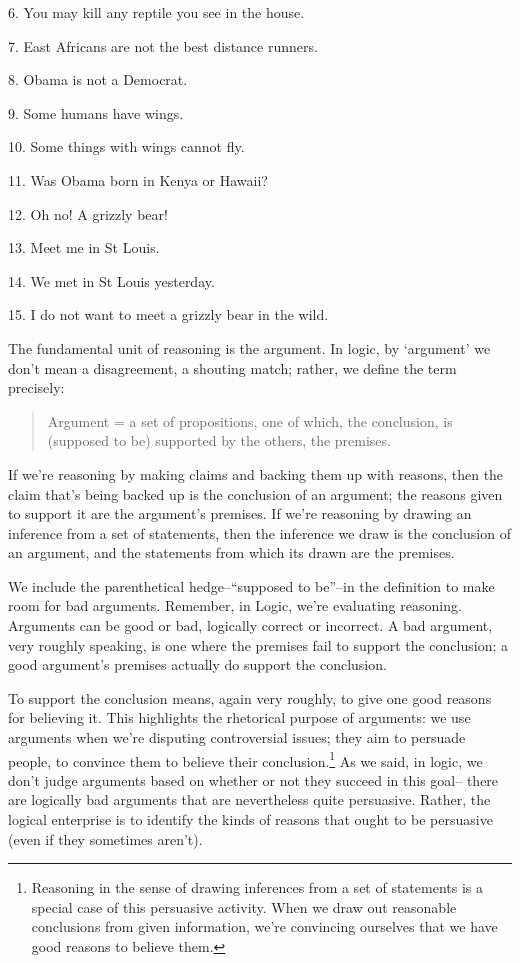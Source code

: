 6.  You may kill any reptile you see in the house.

7.  East Africans are not the best distance runners.

8.  Obama is not a Democrat.

9.  Some humans have wings.

10. Some things with wings cannot fly.

11. Was Obama born in Kenya or Hawaii?

12. Oh no! A grizzly bear!

13. Meet me in St Louis.

14. We met in St Louis yesterday.

15. I do not want to meet a grizzly bear in the wild.


The fundamental unit of reasoning is the argument. In logic, by `argument' we don't mean a
disagreement, a shouting match; rather, we define the term precisely:

\begin{quote}%
\noindent
Argument = a set of propositions, one of which, the conclusion, is (supposed to be)
supported by the others, the premises.
\end{quote}

If we're reasoning by making claims and backing them up with reasons, then the claim that's being
backed up is the conclusion of an argument; the reasons given to support it are the argument's
premises. If we're reasoning by drawing an inference from a set of statements, then the inference
we draw is the conclusion of an argument, and the statements from which its drawn are the
premises.

We include the parenthetical hedge--``supposed to be''--in the definition to make room for bad
arguments. Remember, in Logic, we're evaluating reasoning. Arguments can be good or bad,
logically correct or incorrect. A bad argument, very roughly speaking, is one where the premises
fail to support the conclusion; a good argument's premises actually do support the conclusion.

To support the conclusion means, again very roughly, to give one good reasons for believing it.
This highlights the rhetorical purpose of arguments: we use arguments when we're disputing
controversial issues; they aim to persuade people, to convince them to believe their 
conclusion.\footnote{Reasoning in the sense of drawing inferences from a set of statements is a special case of this persuasive activity.
When we draw out reasonable conclusions from given information, we're convincing ourselves that we have good
reasons to believe them.}
As we said, in logic, we don't judge arguments based on whether or not they succeed in this goal--
there are logically bad arguments that are nevertheless quite persuasive. Rather, the logical
enterprise is to identify the kinds of reasons that ought to be persuasive (even if they sometimes
aren't).

